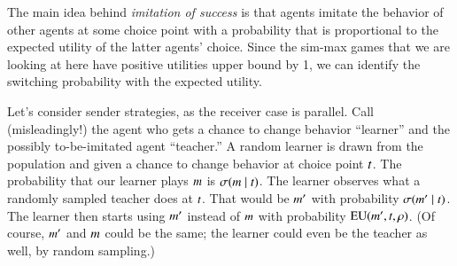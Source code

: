 \documentclass[fleqn,reqno,10pt]{article}
\begin{document}
The main idea behind \emph{imitation of success} is that agents imitate the behavior of other
agents at some choice point with a probability that is proportional to the expected utility of
the latter agents' choice. Since the sim-max games that we are looking at here have positive
utilities upper bound by 1, we can identify the switching probability with the expected
utility.

Let's consider sender strategies, as the receiver case is parallel. Call (misleadingly!) the
agent who gets a chance to change behavior ``learner'' and the possibly to-be-imitated agent
``teacher.'' A random learner is drawn from the population and given a chance to change
behavior at choice point $t$. The probability that our learner plays $m$ is
$\sigma(m \mid t)$. The learner observes what a randomly sampled teacher does at
$t$. That would be $m'$ with probability $\sigma(m' \mid t)$. The
learner then starts using $m'$ instead of $m$ with probability
$\mathrm{EU}(m', t, \rho)$. (Of course, $m'$ and $m$ could be the same; the
learner could even be the teacher as well, by random sampling.)
\end{document}

